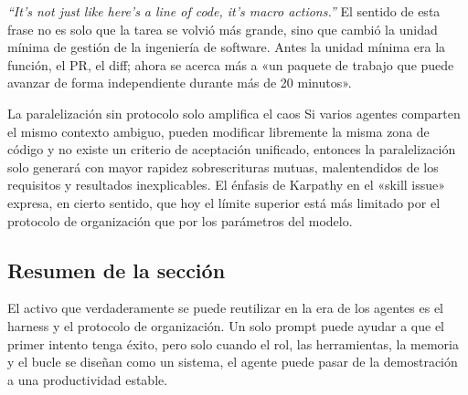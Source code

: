 \textit{``It's not just like here's a line of code, it's macro actions.''} El sentido de esta frase no es solo que la tarea se volvió más grande, sino que cambió la unidad mínima de gestión de la ingeniería de software. Antes la unidad mínima era la función, el PR, el diff; ahora se acerca más a «un paquete de trabajo que puede avanzar de forma independiente durante más de 20 minutos».

\begin{warningbox}{La paralelización sin protocolo solo amplifica el caos}
Si varios agentes comparten el mismo contexto ambiguo, pueden modificar libremente la misma zona de código y no existe un criterio de aceptación unificado, entonces la paralelización solo generará con mayor rapidez sobrescrituras mutuas, malentendidos de los requisitos y resultados inexplicables. El énfasis de Karpathy en el «skill issue» expresa, en cierto sentido, que hoy el límite superior está más limitado por el protocolo de organización que por los parámetros del modelo.
\end{warningbox}

\subsection{Resumen de la sección}
El activo que verdaderamente se puede reutilizar en la era de los agentes es el harness y el protocolo de organización. Un solo prompt puede ayudar a que el primer intento tenga éxito, pero solo cuando el rol, las herramientas, la memoria y el bucle se diseñan como un sistema, el agente puede pasar de la demostración a una productividad estable.

